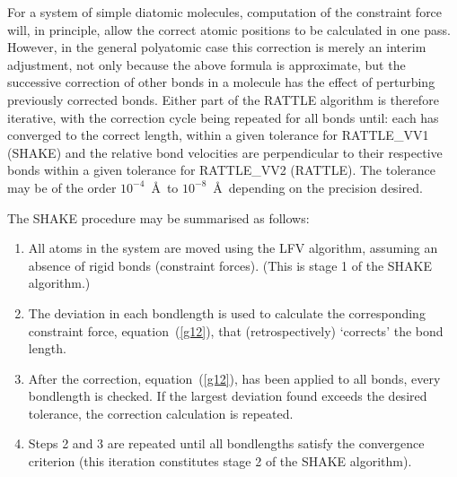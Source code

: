 For a system of simple diatomic molecules, computation of the
constraint force will, in principle, allow the correct atomic
positions to be calculated in one pass.  However, in the general
polyatomic case this correction is merely an interim adjustment, not
only because the above formula is approximate, but the successive
correction of other bonds in a molecule has the effect of perturbing
previously corrected bonds.  Either part of the RATTLE algorithm is
therefore iterative, with the correction cycle being repeated for
all bonds until: each has converged to the correct length, within a
given tolerance for RATTLE\_VV1 (SHAKE) and the relative bond
velocities are perpendicular to their respective bonds within a
given tolerance for RATTLE\_VV2 (RATTLE).  The tolerance may be of
the order $10^{-4}$~\AA~to $10^{-8}$~{\AA}~depending on the
precision desired.

The SHAKE procedure may be summarised as follows:
\begin{enumerate}
\item All atoms in the system are moved using the
LFV algorithm, assuming an absence of
rigid bonds (constraint forces).  (This is
stage 1 of the SHAKE algorithm.)
\item The deviation in each bondlength is used to calculate the
corresponding constraint force, equation~(\ref{g12}), that (retrospectively)
`corrects' the bond length.
\item After the correction, equation~(\ref{g12}), has been applied to all
bonds, every bondlength is checked.  If the largest deviation found
exceeds the desired tolerance, the correction calculation is
repeated.
\item Steps 2 and 3 are repeated until all bondlengths
satisfy the convergence criterion (this iteration constitutes
stage 2 of the SHAKE algorithm).
\end{enumerate}

